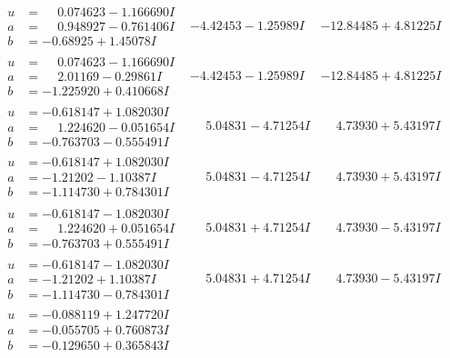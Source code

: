 \documentclass[1p]{elsarticle_modified}
\theoremstyle{definition}
\begin{document}
$$\begin{array}{c|c|c}
\begin{aligned}
u &= \phantom{-}0.074623 - 1.166690 I \\
a &= \phantom{-}0.948927 - 0.761406 I \\
b &= -0.68925 + 1.45078 I\end{aligned}
 & -4.42453 - 1.25989 I & -12.84485 + 4.81225 I \\ \hline\begin{aligned}
u &= \phantom{-}0.074623 - 1.166690 I \\
a &= \phantom{-}2.01169 - 0.29861 I \\
b &= -1.225920 + 0.410668 I\end{aligned}
 & -4.42453 - 1.25989 I & -12.84485 + 4.81225 I \\ \hline\begin{aligned}
u &= -0.618147 + 1.082030 I \\
a &= \phantom{-}1.224620 - 0.051654 I \\
b &= -0.763703 - 0.555491 I\end{aligned}
 & \phantom{-}5.04831 - 4.71254 I & \phantom{-}4.73930 + 5.43197 I \\ \hline\begin{aligned}
u &= -0.618147 + 1.082030 I \\
a &= -1.21202 - 1.10387 I \\
b &= -1.114730 + 0.784301 I\end{aligned}
 & \phantom{-}5.04831 - 4.71254 I & \phantom{-}4.73930 + 5.43197 I \\ \hline\begin{aligned}
u &= -0.618147 - 1.082030 I \\
a &= \phantom{-}1.224620 + 0.051654 I \\
b &= -0.763703 + 0.555491 I\end{aligned}
 & \phantom{-}5.04831 + 4.71254 I & \phantom{-}4.73930 - 5.43197 I \\ \hline\begin{aligned}
u &= -0.618147 - 1.082030 I \\
a &= -1.21202 + 1.10387 I \\
b &= -1.114730 - 0.784301 I\end{aligned}
 & \phantom{-}5.04831 + 4.71254 I & \phantom{-}4.73930 - 5.43197 I \\ \hline\begin{aligned}
u &= -0.088119 + 1.247720 I \\
a &= -0.055705 + 0.760873 I \\
b &= -0.129650 + 0.365843 I\end{aligned}

\end{array}$$
\end{document}
